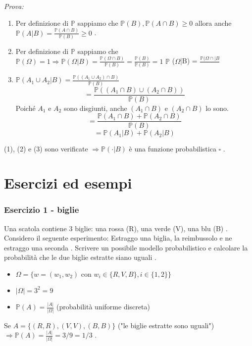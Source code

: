 \documentclass[12pt,a4paper, openany]{book}
\begin{document}
	\textit{Prova:}
	\begin{enumerate}
		\item Per definizione di $\mathbb{P}$ sappiamo che $\mathbb{P}(B), \mathbb{P}(A \cap B) \geq 0$ 
		allora anche $\mathbb{P}(A|B) = \frac{\mathbb{P}(A \cap B)}{\mathbb{P}(B)} \geq 0$ .
		\item Per definizione di $\mathbb{P}$ sappiamo che $\mathbb{P}(\Omega) = 1 \Rightarrow \mathbb{P}(\Omega|B) = \frac{\mathbb{P}(\Omega \cap B)}{\mathbb{P}(B)} = \frac{\mathbb{P}(B)}{\mathbb{P}(B)} = 1$\newline
		$\mathbb{P}$ ($\Omega$|B) = $\frac{\mathbb{P}(\Omega \cap|B}{}$
		\item $\mathbb{P}(A_1 \cup A_2|B) = \frac{\mathbb{P}((A_1 \cup A_2) \cap B)}{\mathbb{P}(B)}$ 
		$$ = \frac{\mathbb{P}((A_1 \cap B) \cup (A_2 \cap B))}{\mathbb{P}(B)} $$ 
		Poiché $A_1$ e $A_2$ sono disgiunti, anche $(A_1 \cap B)$ e $(A_2 \cap B)$ lo sono.
		$$ = \frac{\mathbb{P}(A_1 \cap B) + \mathbb{P}(A_2 \cap B)}{\mathbb{P}(B)} $$ 
		$$ = \mathbb{P}(A_1|B) + \mathbb{P}(A_2|B) $$ 
	\end{enumerate}
	(1), (2) e (3) sono verificate $\Rightarrow \mathbb{P}(\cdot | B)$ è una funzione probabilistica $\square$ .
	
	
	
	
	
	
	
	
	
	
	
	
	
	
	
	
	
	
	
	
	
	\chapter{Esercizi ed esempi}
	\subsection*{Esercizio 1 - biglie }
	Una scatola contiene 3 biglie: una rossa (R), una verde (V), una blu (B) . Considero il seguente esperimento: Estraggo una biglia, la reimbussolo e ne estraggo una seconda . Scrivere un possibile modello probabilistico e calcolare la probabilità che le due biglie estratte siano uguali .
	\begin{itemize}
		\item $\Omega = \{w = (w_1, w_2) \text{ con } w_i \in \{R, V, B\}, i \in \{1, 2\}\}$ 
		\item $|\Omega| = 3^2 = 9$ 
		\item $\mathbb{P}(A) = \frac{|A|}{|\Omega|}$ (probabilità uniforme discreta) 
	\end{itemize}
	Se $A = \{(R, R), (V, V), (B, B)\}$ ("le biglie estratte sono uguali")  $\Rightarrow \mathbb{P}(A) = \frac{|A|}{|\Omega|} = 3/9 = 1/3$ .
	
\end{document}
